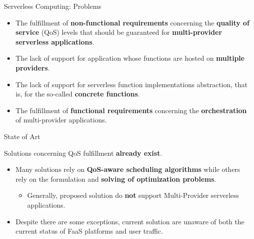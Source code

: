 \documentclass[13.5pt]{beamer}
\newcommand{\B}[1]{\textcolor{TorVergataColor}{\textbf{#1}}}
\begin{document}
\begin{frame}{Serverless Computing: Problems}
	
	\begin{itemize}
		\item The fulfillment of \B{non-functional requirements} concerning the \B{quality of service} (QoS) levels that should be guaranteed for \B{multi-provider serverless applications}.
		\vspace{\baselineskip}
		\item The lack of support for application whose functions are hosted on \B{multiple providers}.
		\vspace{\baselineskip}
		\item The lack of support for serverless function implementations abstraction, that is, for the so-called \B{concrete functions}.
		\vspace{\baselineskip}
		\item The fulfillment of \B{functional requirements} concerning the \B{orchestration} of multi-provider applications.
	\end{itemize}

\end{frame} 
\begin{frame}{State of Art}

Solutions concerning QoS fulfillment \B{already exist}.
\vspace{\baselineskip}
\begin{itemize}
	\item Many solutions rely on \B{QoS-aware scheduling algorithms} while others rely on the formulation and \B{solving of optimization problems}.
	
	\begin{itemize}
		\item Generally, proposed solution do \B{not} support Multi-Provider serverless applications. 
	\end{itemize}
	
	\vspace{\baselineskip}
	\item Despite there are some exceptions, current solution are unaware of both the current status of FaaS platforms and user traffic.
	\vspace{\baselineskip}
	
\end{itemize}

\end{frame} 

\end{document}
